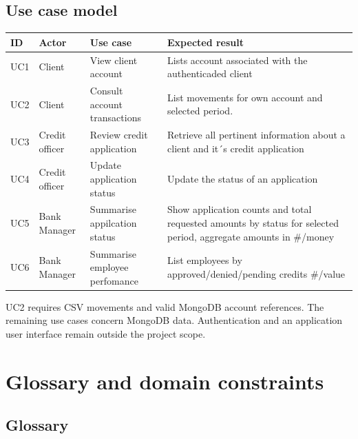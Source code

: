 \documentclass[11pt,a4paper]{article}
\begin{document}
\subsection{Use case model}
\begingroup
\renewcommand{\arraystretch}{1.2}
\begin{tabularx}{\textwidth}{@{}l >{\raggedright\arraybackslash}p{2cm} >{\raggedright\arraybackslash}p{3.4cm} >{\raggedright\arraybackslash}X@{}}
\toprule
\textbf{ID} & \textbf{Actor} & \textbf{Use case} & \textbf{Expected result}\\
\midrule
UC1 & Client & View client account & Lists account associated with the authenticaded client\\
UC2 & Client & Consult account transactions & List movements for own account and selected period.\\
UC3 & Credit officer & Review credit application & Retrieve all pertinent information about a client and it´s credit application\\
UC4 & Credit officer & Update application status & Update the status of an application\\
UC5 & Bank Manager & Summarise appilcation status & Show application counts and total requested amounts by status for selected period, aggregate amounts in \#/money\\
UC6 & Bank Manager & Summarise employee perfomance & List employees by approved/denied/pending credits \#/value\\
\bottomrule
\end{tabularx}
\endgroup

UC2 requires CSV movements and valid MongoDB account references. The remaining
use cases concern MongoDB data. Authentication and an application user interface
remain outside the project scope.

\section{Glossary and domain constraints}

\subsection{Glossary}
\end{document}
